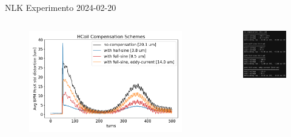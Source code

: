 \documentclass{beamer}					  %
\begin{document}
\begin{frame}{NLK}
    \vspace{0.2 cm}
    Experimento 2024-02-20
    \begin{columns}
        \begin{column}{0.75\textwidth}
            \begin{figure}[H]
                \centering
                \includegraphics[width=1\textwidth]{2024-03-08/figures/hcoil-compensation-scheme.png}
                \label{fig:hcoil-distortion}
            \end{figure}
        \end{column}
        \begin{column}{0.4\textwidth}
            \begin{figure}[H]
                \centering
                \includegraphics[width=1.0\textwidth]{2024-03-08/figures/hcoil-table.png} \hspace*{4cm}

\end{figure}
\end{column}
\end{columns}
\end{frame}
\end{document}
